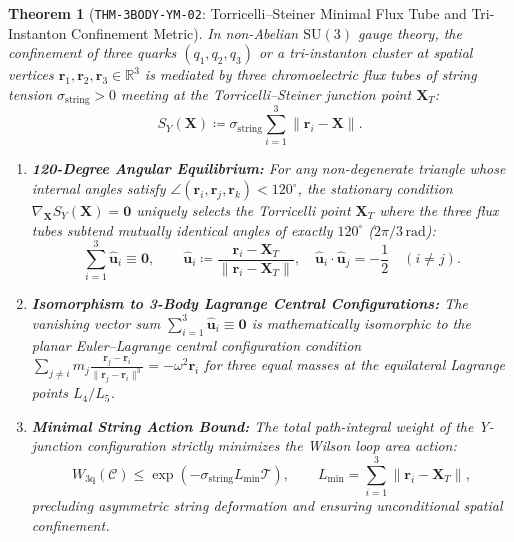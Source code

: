 \documentclass[11pt,a4paper,reqno]{article}
\theoremstyle{plain}
\newtheorem{theorem}{Theorem}[section]
\theoremstyle{definition}
\theoremstyle{remark}
\numberwithin{equation}{section}
\begin{document}
\begin{theorem}[\texttt{THM-3BODY-YM-02}: Torricelli--Steiner Minimal Flux Tube and Tri-Instanton Confinement Metric]
\label{thm:torricelli_steiner_junction}
In non-Abelian $\mathrm{SU}(3)$ gauge theory, the confinement of three quarks $(q_1, q_2, q_3)$ or a tri-instanton cluster at spatial vertices $\mathbf{r}_1, \mathbf{r}_2, \mathbf{r}_3 \in \mathbb{R}^3$ is mediated by three chromoelectric flux tubes of string tension $\sigma_{\mathrm{string}} > 0$ meeting at the Torricelli--Steiner junction point $\mathbf{X}_T$:
\begin{equation}
  S_Y(\mathbf{X}) \coloneqq \sigma_{\mathrm{string}} \sum_{i=1}^3 \|\mathbf{r}_i - \mathbf{X}\|.
\end{equation}
\begin{enumerate}[label=\textbf{(\alph*)}, leftmargin=2.0em]
  \item \textbf{120-Degree Angular Equilibrium:} For any non-degenerate triangle whose internal angles satisfy $\angle(\mathbf{r}_i, \mathbf{r}_j, \mathbf{r}_k) < 120^\circ$, the stationary condition $\nabla_{\mathbf{X}} S_Y(\mathbf{X}) = \mathbf{0}$ uniquely selects the Torricelli point $\mathbf{X}_T$ where the three flux tubes subtend mutually identical angles of exactly $120^\circ$ ($2\pi/3\,\mathrm{rad}$):
  \begin{equation}
    \sum_{i=1}^3 \hat{\mathbf{u}}_i \equiv \mathbf{0}, \qquad \hat{\mathbf{u}}_i \coloneqq \frac{\mathbf{r}_i - \mathbf{X}_T}{\|\mathbf{r}_i - \mathbf{X}_T\|}, \quad \hat{\mathbf{u}}_i \cdot \hat{\mathbf{u}}_j = -\frac{1}{2} \quad (i \ne j).
  \end{equation}
  \item \textbf{Isomorphism to 3-Body Lagrange Central Configurations:} The vanishing vector sum $\sum_{i=1}^3 \hat{\mathbf{u}}_i \equiv \mathbf{0}$ is mathematically isomorphic to the planar Euler--Lagrange central configuration condition $\sum_{j \ne i} m_j \frac{\mathbf{r}_j - \mathbf{r}_i}{\|\mathbf{r}_j - \mathbf{r}_i\|^3} = -\omega^2 \mathbf{r}_i$ for three equal masses at the equilateral Lagrange points $L_4/L_5$.
  \item \textbf{Minimal String Action Bound:} The total path-integral weight of the Y-junction configuration strictly minimizes the Wilson loop area action:
  \begin{equation}
    W_{\mathrm{3q}}(\mathcal{C}) \le \exp\left( - \sigma_{\mathrm{string}} L_{\mathrm{min}} \mathcal{T} \right), \qquad L_{\mathrm{min}} = \sum_{i=1}^3 \|\mathbf{r}_i - \mathbf{X}_T\|,
  \end{equation}
  precluding asymmetric string deformation and ensuring unconditional spatial confinement.
\end{enumerate}
\end{theorem}
\end{document}
